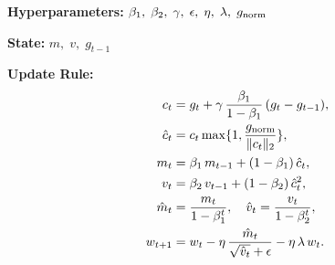 \begin{algorithm}[H]
  \caption{MARS}
  \label{alg:mars}
  \begin{tcolorbox}
  \textbf{Hyperparameters:} $\beta_1,\;\beta_2,\;\gamma,\;\epsilon,\;\eta,\; \lambda,\;g_{\mathrm{norm}}$

  \textbf{State:} $m,\;v,\;g_{t-1}$

  \textbf{Update Rule:}
  \begin{align*}
  c_t &= g_t + \gamma\,\frac{\beta_1}{1-\beta_1}\,(g_t - g_{t-1}),\\
  \hat c_t &= c_t \max\{1, \frac{g_{\mathrm{norm}}}{\|c_t\|_2}\}, \\
  m_t &= \beta_1\,m_{t-1} + (1-\beta_1)\, \hat c_t,\\
  v_t &= \beta_2\,v_{t-1} + (1-\beta_2)\, \hat c_t^2,\\
  \hat m_t &= \frac{m_t}{1-\beta_1^t},\quad
  \hat v_t = \frac{v_t}{1-\beta_2^t},\\
  w_{t+1} &= w_t - \eta\,\frac{\hat m_t}{\sqrt{\hat v_t} + \epsilon} - \eta\,\lambda\,w_t.
  \end{align*}
  \end{tcolorbox}
\end{algorithm}
